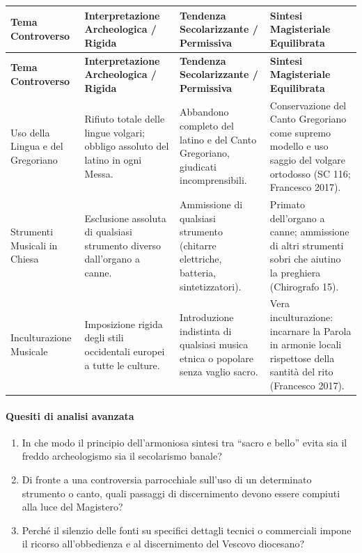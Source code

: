 \documentclass[12pt,a4paper]{article}
\begin{document}
	\begin{longtable}{L{2.5cm}L{3.5cm}L{3.5cm}L{3.5cm}}
		\toprule
		\textbf{Tema Controverso} & \textbf{Interpretazione Archeologica / Rigida} & \textbf{Tendenza Secolarizzante / Permissiva} & \textbf{Sintesi Magisteriale Equilibrata} \\
		\midrule
		\endfirsthead
		\toprule
		\textbf{Tema Controverso} & \textbf{Interpretazione Archeologica / Rigida} & \textbf{Tendenza Secolarizzante / Permissiva} & \textbf{Sintesi Magisteriale Equilibrata} \\
		\midrule
		\endhead
		\bottomrule
		\endlastfoot
		Uso della Lingua e del Gregoriano & Rifiuto totale delle lingue volgari; obbligo assoluto del latino in ogni Messa. & Abbandono completo del latino e del Canto Gregoriano, giudicati incomprensibili. & Conservazione del Canto Gregoriano come supremo modello e uso saggio del volgare ortodosso (SC 116; Francesco 2017). \\
		Strumenti Musicali in Chiesa & Esclusione assoluta di qualsiasi strumento diverso dall'organo a canne. & Ammissione di qualsiasi strumento (chitarre elettriche, batteria, sintetizzatori). & Primato dell'organo a canne; ammissione di altri strumenti sobri che aiutino la preghiera (Chirografo 15). \\
		Inculturazione Musicale & Imposizione rigida degli stili occidentali europei a tutte le culture. & Introduzione indistinta di qualsiasi musica etnica o popolare senza vaglio sacro. & Vera inculturazione: incarnare la Parola in armonie locali rispettose della santità del rito (Francesco 2017). \\
	\end{longtable}
	
	\paragraph{Quesiti di analisi avanzata}\label{quesiti-di-analisi-avanzata}
	
	\begin{enumerate}[label=\arabic*.,leftmargin=*]
		\item In che modo il principio dell'armoniosa sintesi tra ``sacro e bello'' evita sia il freddo archeologismo sia il secolarismo banale?
		\item Di fronte a una controversia parrocchiale sull'uso di un determinato strumento o canto, quali passaggi di discernimento devono essere compiuti alla luce del Magistero?
		\item Perché il silenzio delle fonti su specifici dettagli tecnici o commerciali impone il ricorso all'obbedienza e al discernimento del Vescovo diocesano?
	\end{enumerate}
	
\end{document}
